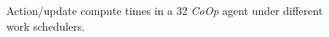 \documentclass[
conference
,10pt
]{IEEEtran}
\newcommand{\Coopfw}{\emph{CoOp}}
\begin{document}
\begin{figure}
	\centering
	\caption{Action/update compute times in a \SI{32}{\bit} \Coopfw{} agent under different work schedulers.\label{fig:work-alloc-32}}
\end{figure}


\end{document}
